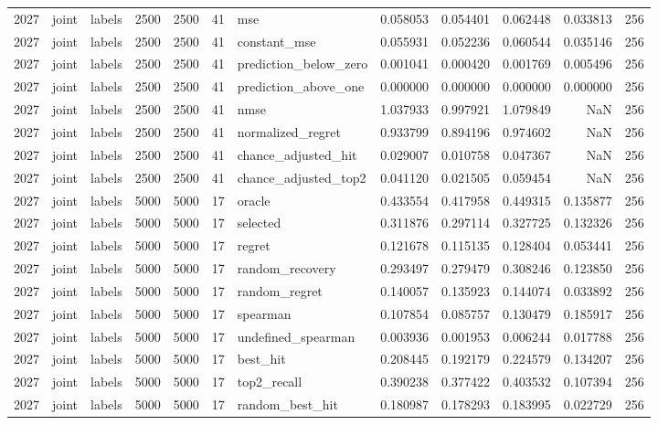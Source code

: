 \begin{tabular}{rllrrrlrrrrr}
2027 & joint & labels & 2500 & 2500 & 41 & mse & 0.058053 & 0.054401 & 0.062448 & 0.033813 & 256 \\
2027 & joint & labels & 2500 & 2500 & 41 & constant_mse & 0.055931 & 0.052236 & 0.060544 & 0.035146 & 256 \\
2027 & joint & labels & 2500 & 2500 & 41 & prediction_below_zero & 0.001041 & 0.000420 & 0.001769 & 0.005496 & 256 \\
2027 & joint & labels & 2500 & 2500 & 41 & prediction_above_one & 0.000000 & 0.000000 & 0.000000 & 0.000000 & 256 \\
2027 & joint & labels & 2500 & 2500 & 41 & nmse & 1.037933 & 0.997921 & 1.079849 & NaN & 256 \\
2027 & joint & labels & 2500 & 2500 & 41 & normalized_regret & 0.933799 & 0.894196 & 0.974602 & NaN & 256 \\
2027 & joint & labels & 2500 & 2500 & 41 & chance_adjusted_hit & 0.029007 & 0.010758 & 0.047367 & NaN & 256 \\
2027 & joint & labels & 2500 & 2500 & 41 & chance_adjusted_top2 & 0.041120 & 0.021505 & 0.059454 & NaN & 256 \\
2027 & joint & labels & 5000 & 5000 & 17 & oracle & 0.433554 & 0.417958 & 0.449315 & 0.135877 & 256 \\
2027 & joint & labels & 5000 & 5000 & 17 & selected & 0.311876 & 0.297114 & 0.327725 & 0.132326 & 256 \\
2027 & joint & labels & 5000 & 5000 & 17 & regret & 0.121678 & 0.115135 & 0.128404 & 0.053441 & 256 \\
2027 & joint & labels & 5000 & 5000 & 17 & random_recovery & 0.293497 & 0.279479 & 0.308246 & 0.123850 & 256 \\
2027 & joint & labels & 5000 & 5000 & 17 & random_regret & 0.140057 & 0.135923 & 0.144074 & 0.033892 & 256 \\
2027 & joint & labels & 5000 & 5000 & 17 & spearman & 0.107854 & 0.085757 & 0.130479 & 0.185917 & 256 \\
2027 & joint & labels & 5000 & 5000 & 17 & undefined_spearman & 0.003936 & 0.001953 & 0.006244 & 0.017788 & 256 \\
2027 & joint & labels & 5000 & 5000 & 17 & best_hit & 0.208445 & 0.192179 & 0.224579 & 0.134207 & 256 \\
2027 & joint & labels & 5000 & 5000 & 17 & top2_recall & 0.390238 & 0.377422 & 0.403532 & 0.107394 & 256 \\
2027 & joint & labels & 5000 & 5000 & 17 & random_best_hit & 0.180987 & 0.178293 & 0.183995 & 0.022729 & 256 \\

\end{tabular}
